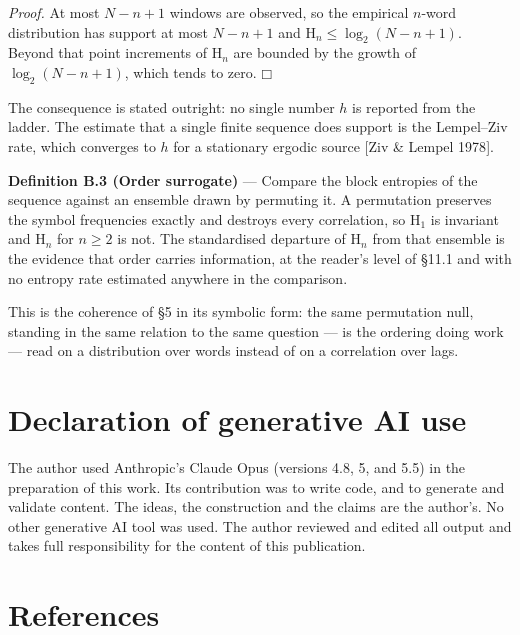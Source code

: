 \documentclass[10pt,letterpaper,twocolumn]{article}
\providecommand{\square}{\mdlgwhtsquare}\providecommand{\Box}{\mdlgwhtsquare}%
\begin{document}
\emph{Proof.} At most \(N-n+1\) windows are observed, so the empirical \(n\)-word distribution has support at most \(N-n+1\) and \(\mathrm H_n\le\log_2(N-n+1)\). Beyond that point increments of \(\mathrm H_n\) are bounded by the growth of \(\log_2(N-n+1)\), which tends to zero. \(\square\)

The consequence is stated outright: no single number \(h\) is reported from the ladder. The estimate that a single finite sequence does support is the Lempel--Ziv rate, which converges to \(h\) for a stationary ergodic source {[}Ziv \& Lempel 1978{]}.

\textbf{Definition B.3 (Order surrogate)} --- Compare the block entropies of the sequence against an ensemble drawn by permuting it. A permutation preserves the symbol frequencies exactly and destroys every correlation, so \(\mathrm H_1\) is invariant and \(\mathrm H_n\) for \(n\ge 2\) is not. The standardised departure of \(\mathrm H_n\) from that ensemble is the evidence that order carries information, at the reader's level of §11.1 and with no entropy rate estimated anywhere in the comparison.

This is the coherence of §5 in its symbolic form: the same permutation null, standing in the same relation to the same question --- is the ordering doing work --- read on a distribution over words instead of on a correlation over lags.

\section{Declaration of generative AI use}\label{declaration-of-generative-ai-use}

The author used Anthropic's Claude Opus (versions 4.8, 5, and 5.5) in the preparation of this work. Its
contribution was to write code, and to generate and validate content. The ideas, the construction
and the claims are the author's. No other generative AI tool was used. The author reviewed and
edited all output and takes full responsibility for the content of this publication.

\section{References}\label{references}
\end{document}
